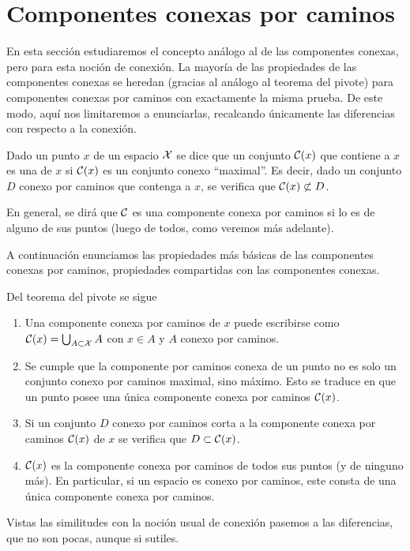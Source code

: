 \section{Componentes conexas por caminos}
En esta sección estudiaremos el concepto análogo al de las componentes conexas, pero para esta noción de conexión. La mayoría de las propiedades de las componentes conexas se heredan (gracias al análogo al teorema del pivote) para componentes conexas por caminos con exactamente la misma prueba. De este modo, aquí nos limitaremos a enunciarlas, recalcando únicamente las diferencias con respecto a la conexión.
\begin{defi}
	Dado un punto $x$ de un espacio $\mathcal{X}$ se dice que un conjunto $\mathcal{C}(x)$ que contiene a $x$ es una  de $x$ si $\mathcal{C}(x)$ es un conjunto conexo ``maximal''. Es decir, dado un conjunto $D$ conexo por caminos que contenga a $x$, se verifica que $\mathcal{C}(x)\not\subset D$.
	
	En general, se dirá que $\mathcal{C}$ es una componente conexa por caminos si lo es de alguno de sus puntos (luego de todos, como veremos más adelante).
\end{defi}
A continuación enunciamos las propiedades más básicas de las componentes conexas por caminos, propiedades compartidas con las componentes conexas.
\begin{obs}Del teorema del pivote se sigue
	\begin{enumerate}
		\item Una componente conexa por caminos de $x$ puede escribirse como $\mathcal{C}(x)=\bigcup_{A\subset\mathcal{X}}A$ con $x\in A$ y $A$ conexo por caminos.
		\item Se cumple que la componente por caminos conexa de un punto no es solo un conjunto conexo por caminos maximal, sino máximo. Esto se traduce en que un punto posee una única componente conexa por caminos $\mathcal{C}(x)$.
		\item Si un conjunto $D$ conexo por caminos corta a la componente conexa por caminos $\mathcal{C}(x)$ de $x$ se verifica que $D\subset \mathcal{C}(x)$.
		\item $\mathcal{C}(x)$ es la componente conexa por caminos de todos sus puntos (y de ninguno más). En particular, si un espacio es conexo por caminos, este consta de una única componente conexa por caminos.\qedhere
	\end{enumerate}
\end{obs}
Vistas las similitudes con la noción usual de conexión pasemos a las diferencias, que no son pocas, aunque si sutiles.

